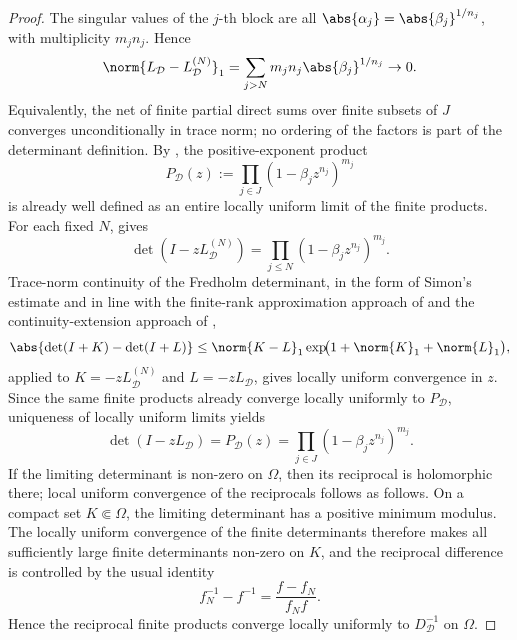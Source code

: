 \begin{proof}
  The singular values of the \(j\)-th block are all
  \(\abs{\alpha_j}=\abs{\beta_j}^{1/n_j}\), with multiplicity
  \(m_jn_j\). Hence
  \[
    \norm{L_{\mathcal D}-L_{\mathcal D}^{(N)}}_1
    =\sum_{j>N}m_j n_j\abs{\beta_j}^{1/n_j}\to0 .
  \]
  Equivalently, the net of finite partial direct sums over finite
  subsets of \(J\) converges unconditionally in trace norm; no ordering of
  the factors is part of the determinant definition.
  By , the positive-exponent
  product
  \[
    P_{\mathcal D}(z):=\prod_{j\in J}(1-\beta_j z^{n_j})^{m_j}
  \]
  is already well defined as an entire locally uniform limit of the finite
  products.
  For each fixed \(N\), 
  gives
  \[
    \det(I-zL_{\mathcal D}^{(N)})
    =\prod_{j\le N}(1-\beta_j z^{n_j})^{m_j}.
  \]
  Trace-norm continuity of the Fredholm determinant, in the form of
  Simon's estimate \cite[Theorem~3.4]{Simon2005TraceIdeals} and in line
  with the finite-rank approximation approach of
  \cite{Simon1977InfiniteDeterminants} and the continuity-extension
  approach of \cite{GohbergGoldbergKrupnik1996TracesDeterminants},
  \[
    \abs{\det(I+K)-\det(I+L)}
    \le\norm{K-L}_1\exp\!\bigl(1+\norm{K}_1+\norm{L}_1\bigr),
  \]
  applied to \(K=-zL_{\mathcal D}^{(N)}\) and
  \(L=-zL_{\mathcal D}\), gives locally uniform convergence in \(z\).
  Since the same finite products already converge locally uniformly to
  \(P_{\mathcal D}\), uniqueness of locally uniform limits yields
  \[
    \det(I-zL_{\mathcal D})=P_{\mathcal D}(z)
    =\prod_{j\in J}(1-\beta_j z^{n_j})^{m_j}.
  \]
  If the limiting determinant is non-zero on \(\Omega\), then its
  reciprocal is holomorphic there; local uniform convergence of the
  reciprocals follows as follows. On a compact set
  \(K\Subset\Omega\), the limiting determinant has a positive minimum
  modulus. The locally uniform convergence of the finite determinants
  therefore makes all sufficiently large finite determinants non-zero on
  \(K\), and the reciprocal difference is controlled by the usual
  identity
  \[
    f_N^{-1}-f^{-1}=\frac{f-f_N}{f_Nf}.
  \]
  Hence the reciprocal finite products converge locally uniformly to
  \(D_{\mathcal D}^{-1}\) on \(\Omega\).
\end{proof}


